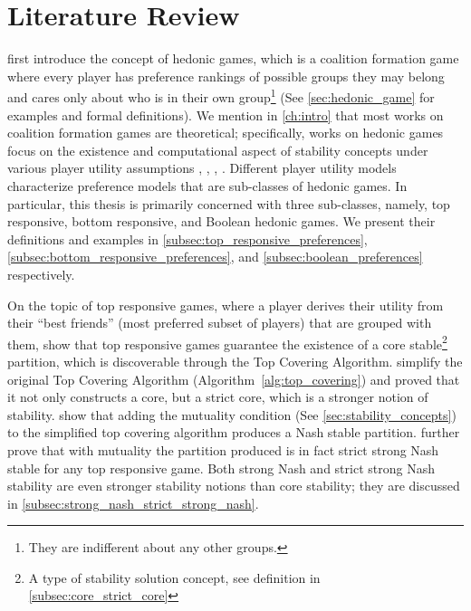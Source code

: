 \chapter{Literature Review}
\label{ch:review}

 first introduce the concept of hedonic games,
which is a coalition formation game where every player has preference rankings
of possible groups they may belong and cares only about who is in their own
group\footnote{They are indifferent about any other groups.} (See
\autoref{sec:hedonic_game} for examples and formal definitions).
We mention in \autoref{ch:intro} that most works on coalition formation games
are theoretical; specifically, works on hedonic games focus on the existence
and computational aspect of stability concepts under various player utility
assumptions \cite {BOGOMOLNAIA2002201}, \cite{Aziz:2012:ESH:2343776.2343806},
\cite{aziz_savani_moulin_2016}, \cite{Aziz:2016:BHG:3032027.3032048}.
Different player utility models characterize preference models that are
sub-classes of hedonic games.
In particular, this thesis is primarily concerned with three sub-classes,
namely, top responsive, bottom responsive, and Boolean hedonic games.
We present their definitions and examples in
\autoref{subsec:top_responsive_preferences},
\autoref{subsec:bottom_responsive_preferences}, and
\autoref{subsec:boolean_preferences} respectively.

On the topic of top responsive games, where a player derives their utility
from their ``best friends'' (most preferred subset of players) that are grouped
with them,  show that top responsive games
guarantee the existence of a core stable\footnote{A type of stability solution
concept, see definition in \autoref{subsec:core_strict_core}} partition, which
is discoverable through the Top Covering Algorithm.
 simplify the original Top Covering Algorithm
(Algorithm~\ref{alg:top_covering}) and proved that it not only constructs a
core, but a strict core, which is a stronger notion of stability.
 show that adding the mutuality condition (See
\autoref{sec:stability_concepts}) to the simplified top covering algorithm
produces a Nash stable partition.
 further prove that with mutuality
the partition produced is in fact strict strong Nash stable for any top
responsive game.
Both strong Nash and strict strong Nash stability are even stronger stability
notions than core stability; they are discussed in
\autoref{subsec:strong_nash_strict_strong_nash}.


